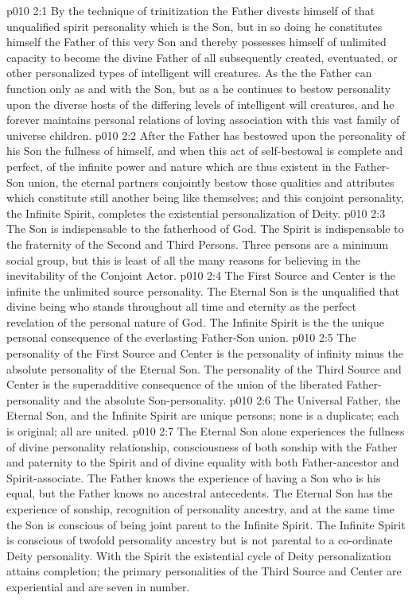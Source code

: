 \vs p010 2:1 By the technique of trinitization the Father divests himself of that unqualified spirit personality which is the Son, but in so doing he constitutes himself the Father of this very Son and thereby possesses himself of unlimited capacity to become the divine Father of all subsequently created, eventuated, or other personalized types of intelligent will creatures. As the  the Father can function only as and with the Son, but as a  he continues to bestow personality upon the diverse hosts of the differing levels of intelligent will creatures, and he forever maintains personal relations of loving association with this vast family of universe children.
\vs p010 2:2 After the Father has bestowed upon the personality of his Son the fullness of himself, and when this act of self\hyp{}bestowal is complete and perfect, of the infinite power and nature which are thus existent in the Father\hyp{}Son union, the eternal partners conjointly bestow those qualities and attributes which constitute still another being like themselves; and this conjoint personality, the Infinite Spirit, completes the existential personalization of Deity.
\vs p010 2:3 The Son is indispensable to the fatherhood of God. The Spirit is indispensable to the fraternity of the Second and Third Persons. Three persons are a minimum social group, but this is least of all the many reasons for believing in the inevitability of the Conjoint Actor.
\pc \vs p010 2:4 The First Source and Center is the infinite  the unlimited source personality. The Eternal Son is the unqualified  that divine being who stands throughout all time and eternity as the perfect revelation of the personal nature of God. The Infinite Spirit is the  the unique personal consequence of the everlasting Father\hyp{}Son union.
\pc \vs p010 2:5 The personality of the First Source and Center is the personality of infinity minus the absolute personality of the Eternal Son. The personality of the Third Source and Center is the superadditive consequence of the union of the liberated Father\hyp{}personality and the absolute Son\hyp{}personality.
\pc \vs p010 2:6 The Universal Father, the Eternal Son, and the Infinite Spirit are unique persons; none is a duplicate; each is original; all are united.
\pc \vs p010 2:7 The Eternal Son alone experiences the fullness of divine personality relationship, consciousness of both sonship with the Father and paternity to the Spirit and of divine equality with both Father\hyp{}ancestor and Spirit\hyp{}associate. The Father knows the experience of having a Son who is his equal, but the Father knows no ancestral antecedents. The Eternal Son has the experience of sonship, recognition of personality ancestry, and at the same time the Son is conscious of being joint parent to the Infinite Spirit. The Infinite Spirit is conscious of twofold personality ancestry but is not parental to a co\hyp{}ordinate Deity personality. With the Spirit the existential cycle of Deity personalization attains completion; the primary personalities of the Third Source and Center are experiential and are seven in number.\plusone
